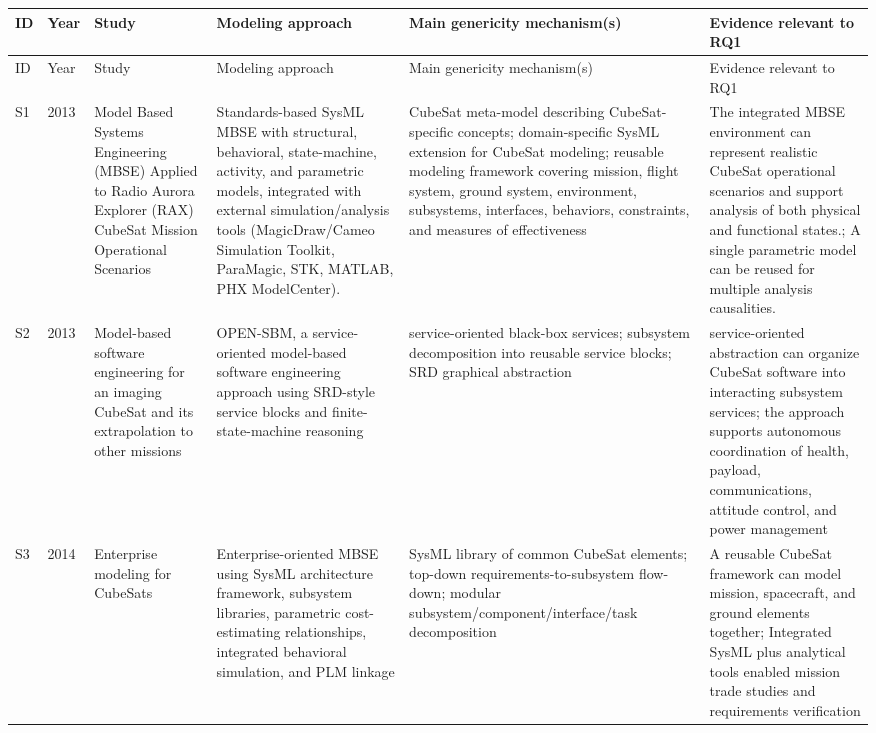 \documentclass[11pt]{article}
\begin{document}
\begin{longtable}{|p{0.6cm}|p{0.8cm}|p{3.1cm}|p{4.0cm}|p{3.3cm}|p{3.3cm}|}
\hline
ID & Year & Study & Modeling approach & Main genericity mechanism(s) & Evidence relevant to RQ1 \\ \hline
\endfirsthead
\hline
ID & Year & Study & Modeling approach & Main genericity mechanism(s) & Evidence relevant to RQ1 \\ \hline
\endhead
S1 & 2013 & Model Based Systems Engineering (MBSE) Applied to Radio Aurora Explorer (RAX) CubeSat Mission Operational Scenarios & Standards-based SysML MBSE with structural, behavioral, state-machine, activity, and parametric models, integrated with external simulation/analysis tools (MagicDraw/Cameo Simulation Toolkit, ParaMagic, STK, MATLAB, PHX ModelCenter). & CubeSat meta-model describing CubeSat-specific concepts; domain-specific SysML extension for CubeSat modeling; reusable modeling framework covering mission, flight system, ground system, environment, subsystems, interfaces, behaviors, constraints, and measures of effectiveness & The integrated MBSE environment can represent realistic CubeSat operational scenarios and support analysis of both physical and functional states.; A single parametric model can be reused for multiple analysis causalities. \\ \hline
S2 & 2013 & Model-based software engineering for an imaging CubeSat and its extrapolation to other missions & OPEN-SBM, a service-oriented model-based software engineering approach using SRD-style service blocks and finite-state-machine reasoning & service-oriented black-box services; subsystem decomposition into reusable service blocks; SRD graphical abstraction & service-oriented abstraction can organize CubeSat software into interacting subsystem services; the approach supports autonomous coordination of health, payload, communications, attitude control, and power management \\ \hline
S3 & 2014 & Enterprise modeling for CubeSats & Enterprise-oriented MBSE using SysML architecture framework, subsystem libraries, parametric cost-estimating relationships, integrated behavioral simulation, and PLM linkage & SysML library of common CubeSat elements; top-down requirements-to-subsystem flow-down; modular subsystem/component/interface/task decomposition & A reusable CubeSat framework can model mission, spacecraft, and ground elements together; Integrated SysML plus analytical tools enabled mission trade studies and requirements verification \\ \hline

\end{longtable}
\end{document}
